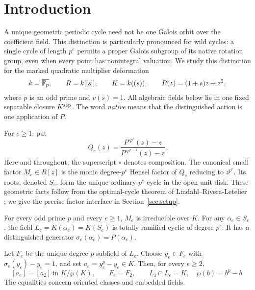 \section{Introduction}

A unique geometric periodic cycle need not be one Galois orbit over
the coefficient field. This distinction is particularly pronounced for
wild cycles: a single cycle of length \(p^e\) permits a proper Galois
subgroup of its native rotation group, even when every point has
nonintegral valuation. We study this distinction for the marked
quadratic multiplier deformation
\[
 k=\overline{\mathbb F_p},\qquad R=k[[s]],\qquad K=k((s)),\qquad
 P(z)=(1+s)z+z^2,
\]
where \(p\) is an odd prime and \(v(s)=1\). All algebraic fields below
lie in one fixed separable closure \(K^{\mathrm{sep}}\). The word \emph{native}
means that the distinguished action is one application of \(P\).

For \(e\ge1\), put
\begin{equation}\label{eq:quotient}
 Q_e(z)=
 \frac{P^{\circ p^e}(z)-z}{P^{\circ p^{e-1}}(z)-z}.
\end{equation}
Here and throughout, the superscript \(\circ\) denotes composition.
The canonical small factor \(M_e\in R[z]\) is the monic degree-\(p^e\)
Hensel factor of \(Q_e\) reducing to \(z^{p^e}\). Its roots, denoted
\(S_e\), form the unique ordinary \(p^e\)-cycle in the open unit disk.
These geometric facts follow from the optimal-cycle theorem of
Lindahl--Rivera-Letelier \cite[Theorem C and Proposition 4.4]{lindahl2016optimal};
we give the precise factor interface in Section~\ref{sec:setup}.

\begin{theorem}\label{thm:main}
For every odd prime \(p\) and every \(e\ge1\), \(M_e\) is irreducible
over \(K\). For any \(\alpha_e\in S_e\), the field
\(L_e=K(\alpha_e)=K(S_e)\) is totally ramified cyclic of degree \(p^e\).
It has a distinguished generator
\(\sigma_e(\alpha_e)=P(\alpha_e)\).

Let \(F_e\) be the unique degree-\(p\) subfield of \(L_e\). Choose
\(y_e\in F_e\) with \(\sigma_e(y_e)-y_e=1\), and set
\(a_e=y_e^p-y_e\in K\). Then, for every \(e\ge2\),
\begin{equation}\label{eq:main-class}
 [a_e]=[a_2]\ \text{in }K/\wp(K),\qquad
 F_e=F_2,\qquad L_1\cap L_e=K,
 \quad \wp(b)=b^p-b.
\end{equation}
The equalities concern oriented classes and embedded fields.
\end{theorem}


